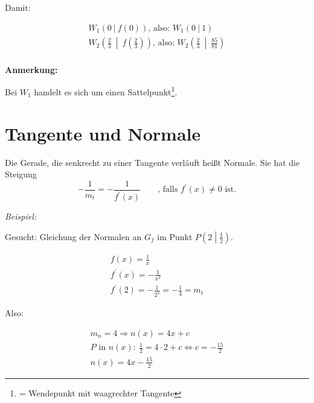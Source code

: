 Damit:

\begin{equation*}
    \begin{gathered}
        W_1(0 \ | \ f(0)) \text{, also: } W_1(0 \ | \ 1) \\
        W_2\left(\frac{2}{3} \ \middle| \ f\left(\frac{2}{3}\right)\right) \text{, also: } W_2\left(\frac{2}{3} \ \middle| \ \frac{85}{81}\right) \\
    \end{gathered}
\end{equation*}

\textbf{Anmerkung:}

Bei $W_1$ handelt es sich um einen Sattelpunkt\footnote{= Wendepunkt mit waagrechter Tangente}.


\section{Tangente und Normale}

\begin{definition}
    Die Gerade, die senkrecht zu einer Tangente verläuft heißt Normale. Sie hat die Steigung 
    $$-\frac{1}{m_t} = -\frac{1}{f^\prime(x)} \qquad \text{, falls } f^\prime(x) \neq 0 \text{ ist.}$$
\end{definition}

\pagebreak

\textit{Beispiel:}

Gesucht: Gleichung der Normalen an $G_f$ im Punkt $P\left(2\middle|\frac{1}{2}\right)$.

\begin{equation*}
    \begin{gathered}
        f(x) = \frac{1}{x} \\
        f^\prime(x) = -\frac{1}{x^2} \\
        f^\prime(2) = -\frac{1}{2^2} = -\frac{1}{4} = m_t
    \end{gathered}
\end{equation*}

Also:

\begin{equation*}
    \begin{gathered}
        m_n = 4 \Rightarrow n(x) = 4x + c \\
        P \text{ in } n(x): \ \frac{1}{2} = 4\cdot2 + c \Leftrightarrow c = -\frac{15}{2} \\
        n(x) = 4x - \frac{15}{2}
    \end{gathered}
\end{equation*}

